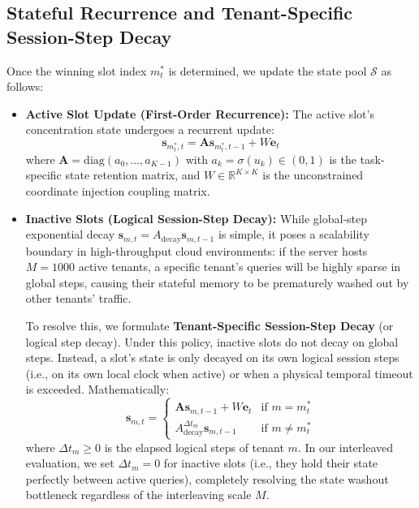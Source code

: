 \subsection{Stateful Recurrence and Tenant-Specific Session-Step Decay}
Once the winning slot index $m^*_t$ is determined, we update the state pool $\mathcal{S}$ as follows:
\begin{itemize}
    \item \textbf{Active Slot Update (First-Order Recurrence):} The active slot's concentration state undergoes a recurrent update:
    \begin{equation}
    \mathbf{s}_{m^*_t, t} = \mathbf{A} \mathbf{s}_{m^*_t, t-1} + W \mathbf{e}_t
    \end{equation}
    where $\mathbf{A} = \text{diag}(a_0, \dots, a_{K-1})$ with $a_k = \sigma(u_k) \in (0, 1)$ is the task-specific state retention matrix, and $W \in \mathbb{R}^{K \times K}$ is the unconstrained coordinate injection coupling matrix.
    \item \textbf{Inactive Slots (Logical Session-Step Decay):} While global-step exponential decay $\mathbf{s}_{m, t} = A_{\text{decay}} \mathbf{s}_{m, t-1}$ is simple, it poses a scalability boundary in high-throughput cloud environments: if the server hosts $M=1000$ active tenants, a specific tenant's queries will be highly sparse in global steps, causing their stateful memory to be prematurely washed out by other tenants' traffic.
    
    To resolve this, we formulate \textbf{Tenant-Specific Session-Step Decay} (or logical step decay). Under this policy, inactive slots do not decay on global steps. Instead, a slot's state is only decayed on its own logical session steps (i.e., on its own local clock when active) or when a physical temporal timeout is exceeded. Mathematically:
    \begin{equation}
    \mathbf{s}_{m, t} = \begin{cases} \mathbf{A} \mathbf{s}_{m, t-1} + W \mathbf{e}_t & \text{if } m = m^*_t \\ A_{\text{decay}}^{\Delta t_m} \mathbf{s}_{m, t-1} & \text{if } m \ne m^*_t \end{cases}
    \end{equation}
    where $\Delta t_m \ge 0$ is the elapsed logical steps of tenant $m$. In our interleaved evaluation, we set $\Delta t_m = 0$ for inactive slots (i.e., they hold their state perfectly between active queries), completely resolving the state washout bottleneck regardless of the interleaving scale $M$.
    

\end{itemize}
